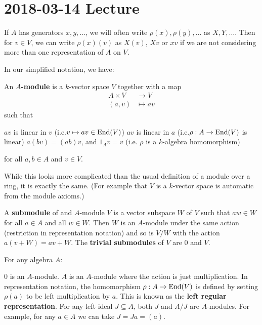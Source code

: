 \section{2018-03-14 Lecture}

\begin{note}
	If $A$ has generators $x,y,\ldots$, we will often write $\rho(x),\rho(y),\ldots$ as $X,Y,\ldots$.
	Then for $v \in V$, we can write $\rho(x)(v)$ as $X(v)$, $Xv$ or $xv$ if we are not considering more than one representation of $A$ on $V$.
\end{note}

In our simplified notation, we have:

\begin{defn}
	An \textbf{$A$-module} is a $k$-vector space $V$ together with a map
	\begin{align*}
		A \times V &\to V \\
		(a,v) &\mapsto av
	\end{align*}
	such that
	\begin{itm}
		\io $av$ is linear in $v$ (i.e.\@ $v \mapsto av \in \operatorname{End}(V)$)
		\io $av$ is linear in $a$ (i.e.\@ $\rho:A \to \operatorname{End}(V)$ is linear)
		\io $a(bv)=(ab)v$, and
		\io $1_Av=v$ (i.e. $\rho$ is a $k$-algebra homomorphism)
	\end{itm}
	for all $a,b \in A$ and $v \in V$.
\end{defn}

\begin{rmk}
	While this looks more complicated than the usual definition of a module over a ring, it is exactly the same. (For example that $V$ is a $k$-vector space is automatic from the module axioms.)
\end{rmk}

\begin{defn}
	A \textbf{submodule} of and $A$-module $V$ is a vector subspace $W$ of $V$ such that $aw \in W$ for all $a \in A$ and all $w \in W$.
	Then $W$ is an $A$-module under the same action (restriction in representation notation) and so is $V/W$ with the action $a(v+W)=av+W$.
	The \textbf{trivial submodules} of $V$ are $0$ and $V$.
\end{defn}

\begin{exam}
	For any algebra $A$:
	\begin{itm}
		\io $0$ is an $A$-module.
		\io $A$ is an $A$-module where the action is just multiplication.
		In representation notation, the homomorphism $\rho: A \to \operatorname{End}(V)$ is defined by setting $\rho(a)$ to be left multiplication by $a$.
		This is known as the \textbf{left regular representation}.
		\io For any left ideal $J \subseteq A$, both $J$ and $A/J$ are $A$-modules.
		For example, for any $a \in A$ we can take $J=Ja=(a)$.
	\end{itm}
\end{exam}

